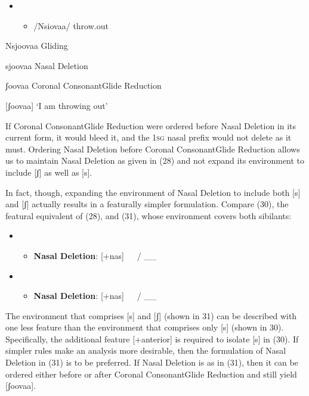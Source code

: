 \begin{itemize}
\item \setcounter{itemize}{0}
\begin{itemize}
\item /Nsiovaa/  throw.out

\end{itemize}
\end{itemize}

Nsjoovaa  Gliding

sjoovaa   Nasal Deletion

ʃoovaa  Coronal ConsonantGlide Reduction

[ʃoovaa]  ‘I am throwing out’

If Coronal ConsonantGlide Reduction were ordered before Nasal Deletion in its current form, it would bleed it, and the 1\textsc{sg} nasal prefix would not delete as it must. Ordering Nasal Deletion before Coronal ConsonantGlide Reduction allows us to maintain Nasal Deletion as given in (28) and not expand its environment to include [ʃ] as well as [s]. 

In fact, though, expanding the environment of Nasal Deletion to include both [s] and [ʃ] actually results in a featurally simpler formulation. Compare (30), the featural equivalent of (28), and (31), whose environment covers both sibilants:

\begin{itemize}
\item \setcounter{itemize}{0}
\begin{itemize}
\item \textbf{Nasal Deletion}: [+nas]   / \_\_ 

\end{itemize}
\end{itemize}
\begin{itemize}
\item \setcounter{itemize}{0}
\begin{itemize}
\item \textbf{Nasal Deletion}: [+nas]   / \_\_ 

\end{itemize}
\end{itemize}

The environment that comprises [s] and [ʃ] (shown in 31) can be described with one less feature than the environment that comprises only [s] (shown in 30). Specifically, the additional feature [+anterior] is required to isolate [s] in (30). If simpler rules make an analysis more desirable, then the formulation of Nasal Deletion in (31) is to be preferred. If Nasal Deletion is as in (31), then it can be ordered either before or after Coronal ConsonantGlide Reduction and still yield [ʃoovaa]. 

